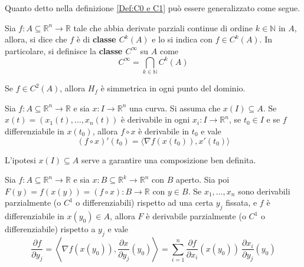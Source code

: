 Quanto detto nella definizione \ref{Def:C0 e C1} può essere generalizzato come segue.
\begin{definition} \label{Def: Ck}
    Sia $f:A \subseteq \mathbb{R}^n\to \mathbb{R}$ tale che abbia derivate parziali continue di ordine $k \in \mathbb{N}$ in $A$, allora, si dice che $f$ è di \textbf{classe $C^k(A)$} e lo si indica con $f \in C^k(A)$.
    In particolare, si definisce la \textbf{classe $C^\infty$} su $A$ come
    \begin{equation}
      C^\infty= \bigcap_{k \in \mathbb{N}}{C^k(A)}
    \end{equation}
\end{definition}
\begin{corollary}
    Se $f \in C^2(A)$, allora $H_f$ è simmetrica in ogni punto del dominio.
\end{corollary}
\begin{theorem} \label{Teo: Derivata composta 1}
    Sia $f:A \subseteq \mathbb{R}^n \to \mathbb{R}$ e sia $x: I \to \mathbb{R}^n$ una curva. Si assuma che $x(I) \subseteq A$. Se $x(t)=(x_1(t), \dots, x_n(t))$ è derivabile in ogni $x_i:I \to \mathbb{R}^n$, se $t_0 \in I$ e se $f$ differenziabile in $x(t_0)$, allora
    $f \circ x$ è derivabile in $t_0$ e vale
    \begin{equation}
        (f \circ x)'(t_0)= \langle \nabla f(x(t_0)), x'(t_0) \rangle \label{Eq: Derivata composta 1}
    \end{equation}
\end{theorem}
\begin{oss}
    L'ipotesi $x(I) \subseteq A$ serve a garantire una composizione ben definita.
\end{oss}
\begin{theorem} \label{Teo: Derivata composta 2}
    Sia $f:A \subseteq \mathbb{R}^n \to \mathbb{R}$ e sia $x: B \subseteq \mathbb{R}^k \to \mathbb{R}^n$ con $B$ aperto. Sia poi $F(y)=f(x(y))=(f \circ x): B \to \mathbb{R}$ con $y \in B$. Se $x_1, \dots, x_n$ sono derivabili parzialmente (o $C^1$ o differenziabili) rispetto ad una certa $y_j$ fissata, e $f$ è differenziabile in $x(y_0) \in A$, allora $F$ è derivabile parzialmente (o $C^1$ o differenziabile) rispetto a $y_j$ e vale 
    \begin{equation} \label{Eq: Derivata composta 2}
        \frac{\partial f}{\partial y_j}=\left\langle \nabla f(x(y_0)), \frac{\partial x}{\partial y_j}(y_0)\right\rangle=\sum\limits_{i=1}^{n}{\frac{\partial f}{\partial x_i}(x(y_0))\ \frac{\partial x_i}{\partial y_j}(y_0)}
    \end{equation}    
\end{theorem}
